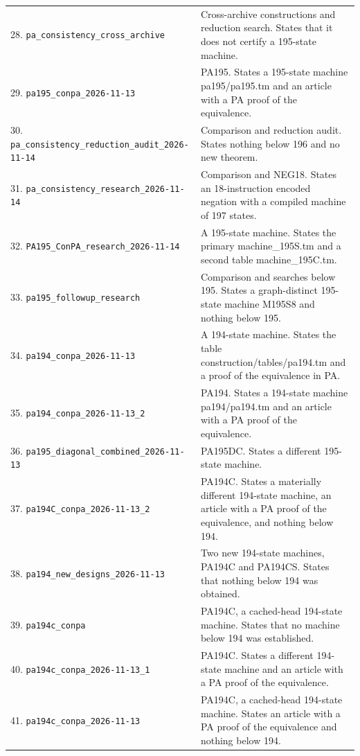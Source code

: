 \begin{longtable}{@{}p{.37\linewidth}p{.59\linewidth}@{}}
28. \nolinkurl{pa_consistency_cross_archive} & Cross-archive constructions and reduction search. States that it does not certify a 195-state machine.\\[4pt]
29. \nolinkurl{pa195_conpa_2026-11-13} & PA195. States a 195-state machine pa195/pa195.tm and an article with a PA proof of the equivalence.\\[4pt]
30. \nolinkurl{pa_consistency_reduction_audit_2026-11-14} & Comparison and reduction audit. States nothing below 196 and no new theorem.\\[4pt]
31. \nolinkurl{pa_consistency_research_2026-11-14} & Comparison and NEG18. States an 18-instruction encoded negation with a compiled machine of 197 states.\\[4pt]
32. \nolinkurl{PA195_ConPA_research_2026-11-14} & A 195-state machine. States the primary machine\_195S.tm and a second table machine\_195C.tm.\\[4pt]
33. \nolinkurl{pa195_followup_research} & Comparison and searches below 195. States a graph-distinct 195-state machine M195S8 and nothing below 195.\\[4pt]
34. \nolinkurl{pa194_conpa_2026-11-13} & A 194-state machine. States the table construction/tables/pa194.tm and a proof of the equivalence in PA.\\[4pt]
35. \nolinkurl{pa194_conpa_2026-11-13_2} & PA194. States a 194-state machine pa194/pa194.tm and an article with a PA proof of the equivalence.\\[4pt]
36. \nolinkurl{pa195_diagonal_combined_2026-11-13} & PA195DC. States a different 195-state machine.\\[4pt]
37. \nolinkurl{pa194C_conpa_2026-11-13_2} & PA194C. States a materially different 194-state machine, an article with a PA proof of the equivalence, and nothing below 194.\\[4pt]
38. \nolinkurl{pa194_new_designs_2026-11-13} & Two new 194-state machines, PA194C and PA194CS. States that nothing below 194 was obtained.\\[4pt]
39. \nolinkurl{pa194c_conpa} & PA194C, a cached-head 194-state machine. States that no machine below 194 was established.\\[4pt]
40. \nolinkurl{pa194c_conpa_2026-11-13_1} & PA194C. States a different 194-state machine and an article with a PA proof of the equivalence.\\[4pt]
41. \nolinkurl{pa194c_conpa_2026-11-13} & PA194C, a cached-head 194-state machine. States an article with a PA proof of the equivalence and nothing below 194.\\[4pt]

\end{longtable}
